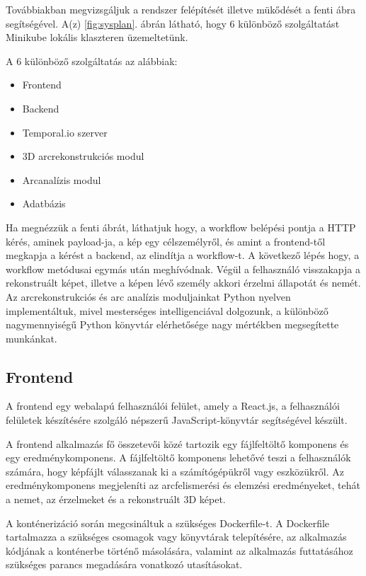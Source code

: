 \documentclass[12pt,a4]{article}
\begin{document}
            \clearpage

        	Továbbiakban megvizsgáljuk a rendszer felépítését illetve mükődését a
        	fenti ábra segítségével. A(z) \ref{fig:sysplan}. ábrán látható, hogy 6 különböző szolgáltatást Minikube lokális klaszteren üzemeltetünk.

        	A 6 különböző szolgáltatás az alábbiak:
        	\begin{itemize}
        		\item Frontend
        		\item Backend
        		\item Temporal.io szerver
        		\item 3D arcrekonstrukciós modul
        		\item Arcanalízis modul
        		\item Adatbázis
        	\end{itemize}
        
        	Ha megnézzük a fenti ábrát, láthatjuk hogy, a workflow belépési pontja a HTTP kérés, aminek payload-ja, a kép egy célszemélyről, és amint a
        	frontend-től megkapja a kérést a backend, az elindítja a workflow-t. A következő lépés hogy, a workflow metódusai egymás után meghívódnak.
        	Végül a felhasználó visszakapja a rekonstruált képet, illetve a képen lévő személy akkori érzelmi állapotát és nemét. Az arcrekonstrukciós és arc analízis moduljainkat Python nyelven implementáltuk, mivel mesterséges intelligenciával dolgozunk, a különböző nagymennyiségű Python könyvtár elérhetősége nagy mértékben megsegítette munkánkat.
        
        \subsection{Frontend}

            A frontend egy webalapú felhasználói felület, amely a React.js, a felhasználói felületek készítésére szolgáló népszerű JavaScript-könyvtár segítségével készült.

            A frontend alkalmazás fő összetevői közé tartozik egy fájlfeltöltő komponens és egy eredménykomponens. A fájlfeltöltő komponens lehetővé teszi a felhasználók számára, hogy képfájlt válasszanak ki a számítógépükről vagy eszközükről. Az eredménykomponens megjeleníti az arcfelismerési és elemzési eredményeket, tehát a nemet, az érzelmeket és a rekonstruált 3D képet.

            A konténerizáció során megcsináltuk a szükséges Dockerfile-t. A Dockerfile tartalmazza a szükséges csomagok vagy könyvtárak telepítésére, az alkalmazás kódjának a konténerbe történő másolására, valamint az alkalmazás futtatásához szükséges parancs megadására vonatkozó utasításokat. 
\end{document}
